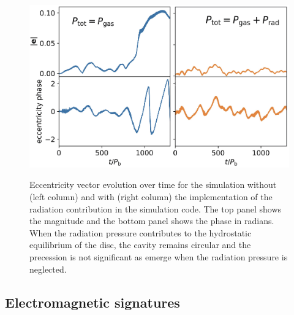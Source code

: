 \documentclass{aa}
\begin{document}
\begin{figure}[h]
    \begin{center}
    \label{fig:ecc} 
\includegraphics[width=\columnwidth]{Fig/Results/ecc.png} \\   
    \caption{Eccentricity vector evolution over time for the simulation without (left column) and with (right column) the implementation of the radiation contribution in the simulation code. The top panel shows the magnitude and the bottom panel shows the phase in radians. When the radiation pressure contributes to the hydrostatic equilibrium of the disc, the cavity remains circular and the precession is not significant as emerge when the radiation pressure is neglected.}
    \end{center}
\end{figure}

\subsection{Electromagnetic signatures}
\label{Results_SEDsLCs}
\end{document}

